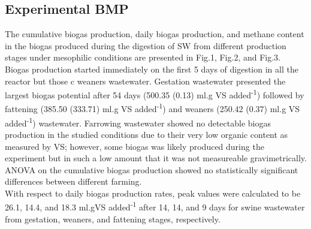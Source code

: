 \subsection{Experimental BMP}
The cumulative biogas production, daily biogas production, and methane content in the biogas produced during the digestion of SW from different production stages under mesophilic conditions are presented in Fig.1, Fig.2, and Fig.3.\\
Biogas production started immediately on the first 5 days of digestion in all the reactor but those c weaners wastewater.
Gestation wastewater presented the largest biogas potential after 54 days (500.35 (0.13) ml.g VS added\textsuperscript{-1}) followed by fattening (385.50 (333.71) ml.g VS added\textsuperscript{-1}) and weaners (250.42 (0.37) ml.g VS added\textsuperscript{-1}) wastewater. Farrowing wastewater showed no detectable biogas production in the studied conditions due to their very low organic content as measured by VS; however, some biogas was likely produced during the experiment but in such a low amount that it was not measureable gravimetrically.  ANOVA on the cumulative biogas production showed no statistically significant differences between different farming.\\
With respect to daily biogas production rates, peak values were calculated to be 26.1, 14.4, and 18.3 ml.gVS added\textsuperscript{-1} after 14, 14, and 9 days for swine wastewater from gestation, weaners, and fattening stages, respectively.